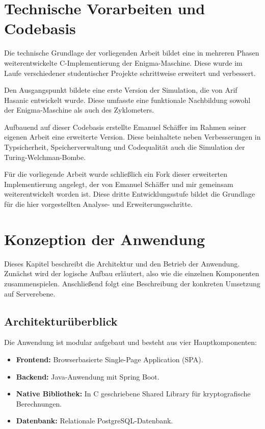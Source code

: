 \documentclass[12pt, ngerman, a4paper, numbers=noenddot]{article}
\begin{document}
\section{Technische Vorarbeiten und Codebasis}
\label{sec:analyse_c_implementation}

Die technische Grundlage der vorliegenden Arbeit bildet eine in mehreren Phasen weiterentwickelte C-Implementierung der Enigma-Maschine. Diese wurde im Laufe verschiedener studentischer Projekte schrittweise erweitert und verbessert.

Den Ausgangspunkt bildete eine erste Version der Simulation, die von Arif Hasanic entwickelt wurde. Diese umfasste eine funktionale Nachbildung sowohl der Enigma-Maschine als auch des Zyklometers\autocite{hasanic2024enigma}.

Aufbauend auf dieser Codebasis erstellte Emanuel Schäffer im Rahmen seiner eigenen Arbeit eine erweiterte Version. Diese beinhaltete neben Verbesserungen in Typsicherheit, Speicherverwaltung und Codequalität auch die Simulation der Turing-Welchman-Bombe\autocite{schaffer2025enigma}.

Für die vorliegende Arbeit wurde schließlich ein Fork dieser erweiterten Implementierung angelegt, der von Emanuel Schäffer und mir gemeinsam weiterentwickelt worden ist\autocite{schaffer2025enigmaserver}. Diese dritte Entwicklungsstufe bildet die Grundlage für die hier vorgestellten Analyse- und Erweiterungsschritte.



\newpage
\section{Konzeption der Anwendung}

Dieses Kapitel beschreibt die Architektur und den Betrieb der Anwendung. Zunächst wird der logische Aufbau erläutert, also wie die einzelnen Komponenten zusammenspielen. Anschließend folgt eine Beschreibung der konkreten Umsetzung auf Serverebene.

\subsection{Architekturüberblick}

Die Anwendung ist modular aufgebaut und besteht aus vier Hauptkomponenten:

\begin{itemize}
	\item \textbf{Frontend:} Browserbasierte Single-Page Application (SPA).
	\item \textbf{Backend:} Java-Anwendung mit Spring Boot.
	\item \textbf{Native Bibliothek:} In C geschriebene Shared Library für kryptografische Berechnungen.
	\item \textbf{Datenbank:} Relationale PostgreSQL-Datenbank.
\end{itemize}
\end{document}
